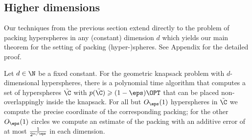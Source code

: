 \subsection{Higher dimensions}

Our techniques from the previous section extend directly to the problem of packing
hyperspheres in any (constant) dimension $d$ which yields our main theorem for the setting of packing
(hyper-)spheres. See Appendix for the detailed proof. 

\begin{theorem}\label{thm:d-dim-ptas} Let $d\in\N$ be a fixed constant. For the geometric knapsack problem with
	$d$-dimensional hyperspheres, there is a polynomial time algorithm
	that computes a set of hyperspheres $\tilde{\C}$ with $p(\tilde{\C})\geqslant(1-\eps)\OPT$
	that can be placed non-overlappingly inside the knapsack. For all
	but $O_{\eps}(1)$ hyperspheres in $\tilde{\C}$ we compute the
	precise coordinate of the corresponding packing; for the other $O_{\eps}(1)$
	circles we compute an estimate of the packing with an additive error
	of at most $\frac{1}{2^{n/\eps}}$ in each dimension. \end{theorem}

